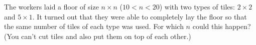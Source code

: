 The workers laid a floor of size $n\times n$ ($10 <n <20$) with two types of tiles: $2 \times 2$ and $5\times 1$. It turned out that they were able to completely lay the floor so that the same number of tiles of each type was used. For which $n$ could this happen?
(You can’t cut tiles and also put them on top of each other.)